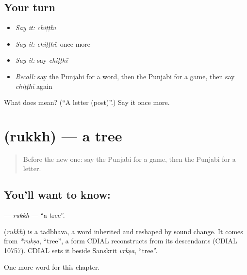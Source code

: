 \subsection*{Your turn}
\begin{itemize}
\raggedright
  \item \emph{Say it:} \emph{chiṭṭhī}
  \item \emph{Say it:} \emph{chiṭṭhī}, once more
  \item \emph{Say it:} say \emph{chiṭṭhī}
  \item \emph{Recall:} say the Punjabi for a word, then the Punjabi for a game, then say \emph{chiṭṭhī} again
\end{itemize}

\begin{tcolorbox}[breakable,colback=teal!4,colframe=teal!35!black,title={Before you move on}]
What does  mean? (\textquotedblleft{}A letter (post)\textquotedblright{}.) Say it once more.
\end{tcolorbox}
\section[\texorpdfstring{\pa{ਰੁੱਖ} (rukkh)}{ਰੁੱਖ (rukkh)}]{ (rukkh) — a tree}

\label{lesson:PA-C73-rukkh}



\begin{quote}
Before the new one: say the Punjabi for a game, then the Punjabi for a letter.
\end{quote}

\subsection*{You'll want to know: }
\textbf{} — \emph{rukkh} — \textquotedblleft{}a tree\textquotedblright{}.

\begin{cousinweb}
\textbf{} (\emph{rukkh}) is a tadbhava, a word inherited and reshaped by sound change. It comes from \emph{*rukṣa}, \textquotedblleft{}tree\textquotedblright{}, a form CDIAL reconstructs from its descendants (CDIAL 10757). CDIAL sets it beside Sanskrit \emph{vṛkṣa}, \textquotedblleft{}tree\textquotedblright{}.
\end{cousinweb}

\begin{grammarlens}[title={What you've built}]
One more word for this chapter.
\end{grammarlens}

